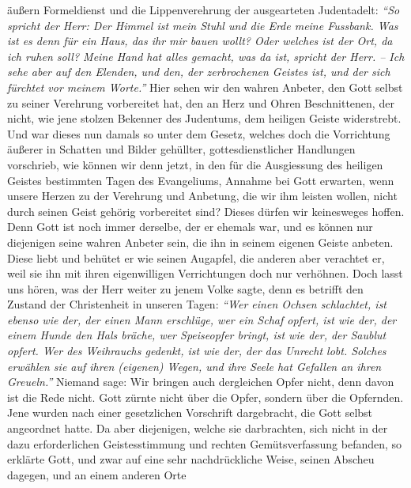 äußern Formeldienst und
die Lippenverehrung der ausgearteten Judentadelt:
\textit{"`So spricht der Herr: Der
Himmel ist mein Stuhl und die Erde meine Fussbank. Was ist es denn für ein
Haus, das ihr mir bauen wollt? Oder welches ist der Ort, da ich ruhen soll?
Meine Hand hat alles gemacht, was da ist, spricht der Herr. -- Ich sehe aber auf
den Elenden, und den, der zerbrochenen Geistes ist, und der sich fürchtet vor
meinem Worte."'}
Hier sehen wir den wahren Anbeter, den
Gott selbst zu seiner Verehrung vorbereitet hat, den an Herz und Ohren
Beschnittenen, der nicht, wie jene stolzen Bekenner des
Judentums, dem
heiligen Geiste widerstrebt. Und war dieses nun damals
so unter dem Gesetz, welches doch die Vorrichtung
äußerer
in Schatten und
Bilder gehüllter, gottesdienstlicher Handlungen vorschrieb, wie können wir denn
jetzt, in den für die Ausgiessung des heiligen Geistes bestimmten Tagen des
Evangeliums, Annahme bei Gott erwarten, wenn unsere Herzen
zu der Verehrung und
Anbetung, die wir ihm leisten wollen, nicht durch seinen Geist gehörig
vorbereitet sind? Dieses dürfen wir keinesweges hoffen. Denn Gott ist noch immer
derselbe, der er ehemals war, und es können nur
diejenigen seine wahren Anbeter sein, die ihn in seinem
eigenen Geiste anbeten.
Diese liebt und behütet er wie seinen Augapfel, die anderen aber verachtet er,
weil sie ihn mit ihren eigenwilligen Verrichtungen doch nur verhöhnen. Doch
lasst uns hören, was der Herr weiter zu jenem Volke sagte, denn es betrifft den
Zustand der Christenheit in unseren Tagen:
\textit{"`Wer einen Ochsen schlachtet, ist
ebenso wie der, der einen Mann erschlüge, wer ein Schaf opfert, ist wie der, der
einem
Hunde den Hals bräche, wer Speiseopfer bringt, ist wie der, der Saublut
opfert. Wer des Weihrauchs gedenkt, ist wie der, der
das Unrecht lobt. Solches erwählen sie auf ihren (eigenen) Wegen, und ihre Seele
hat Gefallen an ihren Greueln."'}
Niemand sage: Wir bringen
auch dergleichen Opfer nicht, denn davon ist die Rede nicht. Gott zürnte nicht
über die Opfer, sondern über die Opfernden. Jene wurden nach einer gesetzlichen
Vorschrift dargebracht, die Gott selbst angeordnet hatte. Da aber diejenigen,
welche sie darbrachten, sich nicht in der dazu erforderlichen Geistesstimmung
und rechten Gemütsverfassung befanden, so erklärte Gott, und zwar auf eine sehr
nachdrückliche Weise, seinen Abscheu dagegen, und an einem anderen Orte
